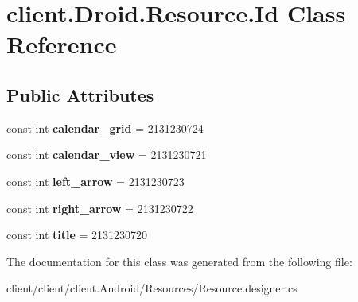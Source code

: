 \hypertarget{classclient_1_1Droid_1_1Resource_1_1Id}{\section{client.\-Droid.\-Resource.\-Id Class Reference}
\label{classclient_1_1Droid_1_1Resource_1_1Id}
}
\subsection*{Public Attributes}
\begin{DoxyCompactItemize}
\item 
\hypertarget{classclient_1_1Droid_1_1Resource_1_1Id_a61248253247b83b6f3500c65e5d0f5f3}{const int {\bfseries calendar\-\_\-grid} = 2131230724}\label{classclient_1_1Droid_1_1Resource_1_1Id_a61248253247b83b6f3500c65e5d0f5f3}

\item 
\hypertarget{classclient_1_1Droid_1_1Resource_1_1Id_acf03ad39aa58731fd22dde2a842a67e5}{const int {\bfseries calendar\-\_\-view} = 2131230721}\label{classclient_1_1Droid_1_1Resource_1_1Id_acf03ad39aa58731fd22dde2a842a67e5}

\item 
\hypertarget{classclient_1_1Droid_1_1Resource_1_1Id_ac27c793d42ca039d68fc7c61a84033ca}{const int {\bfseries left\-\_\-arrow} = 2131230723}\label{classclient_1_1Droid_1_1Resource_1_1Id_ac27c793d42ca039d68fc7c61a84033ca}

\item 
\hypertarget{classclient_1_1Droid_1_1Resource_1_1Id_a1bd1f39f6c9075276a61184b3a522a52}{const int {\bfseries right\-\_\-arrow} = 2131230722}\label{classclient_1_1Droid_1_1Resource_1_1Id_a1bd1f39f6c9075276a61184b3a522a52}

\item 
\hypertarget{classclient_1_1Droid_1_1Resource_1_1Id_a54e27654765266259b895b536f12e204}{const int {\bfseries title} = 2131230720}\label{classclient_1_1Droid_1_1Resource_1_1Id_a54e27654765266259b895b536f12e204}

\end{DoxyCompactItemize}


The documentation for this class was generated from the following file\-:\begin{DoxyCompactItemize}
\item 
client/client/client.\-Android/\-Resources/Resource.\-designer.\-cs\end{DoxyCompactItemize}
